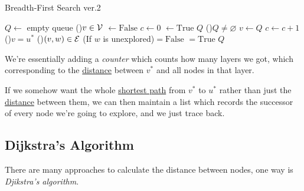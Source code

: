 \begin{algorithm}[H]\label{algo:BFS-2}
	\DontPrintSemicolon
	\caption{Breadth-First Search ver.2}
	\BlankLine
	\(Q\gets \) empty queue
	\For(){\(v\in \mathcal{\MakeUppercase{v}} \)}{
		\(\gets \mathrm{False}\)
	}
	\(c\gets 0\) 
	\;
	\(\gets \mathrm{True}\) 
	\(Q\)\;
	\;
	\While(){\(Q\neq \varnothing \)}{
		\(v\gets Q\)\pop{}\;
		\(c\gets c + 1\)\;
		\If(){\(v = u^{\ast} \)}{
		}
		\For(){\((v, w)\in\mathcal{\MakeUppercase{E}}\)}{
			\If(If \(w\) is unexplored){\(= \mathrm{False}\)}{
				\(=\mathrm{True}\)
				\(Q\)\;
			}
		}
	}
	\Return{}\;
\end{algorithm}

\begin{intuition}[Counter]
	We're essentially adding a \emph{counter} which counts how many layers we got, which corresponding to the \hyperref[def:distance-between-nodes]{distance} between
	\(v^{\ast} \) and all nodes in that layer.
\end{intuition}

\begin{remark}
	If we somehow want the whole \hyperref[def:shortest-path]{shortest path} from \(v^{\ast} \) to \(u^{\ast} \) rather than just the \hyperref[def:distance-between-nodes]{distance} between them, we can then maintain a list which records the successor of every node we're going to explore, and we just trace back.
\end{remark}

\subsection{Dijkstra's Algorithm}
There are many approaches to calculate the distance between nodes, one way is \emph{Djikstra's algorithm}.

